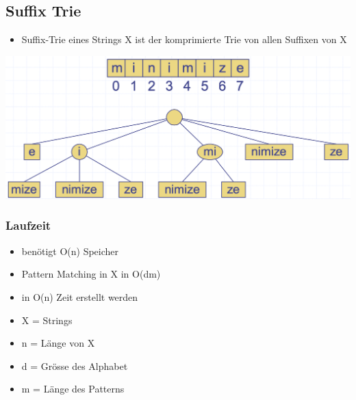 \subsection{Suffix Trie}
\begin{itemize}
    \item Suffix-Trie eines Strings X ist der komprimierte Trie von allen Suffixen von X
\end{itemize}
\vspace{-8pt}
\begin{center}
    \includegraphics[scale=0.25]{graphic/09 Tries/Suffix.png}
\end{center}
\vspace{-8pt}
\subsubsection{Laufzeit}
\begin{itemize}
    \item benötigt O(n) Speicher
    \item Pattern Matching in X in O(dm)
    \item in O(n) Zeit erstellt werden
    \item X = Strings
    \item n = Länge von X
    \item d = Grösse des Alphabet
    \item m = Länge des Patterns
\end{itemize}

\newpage